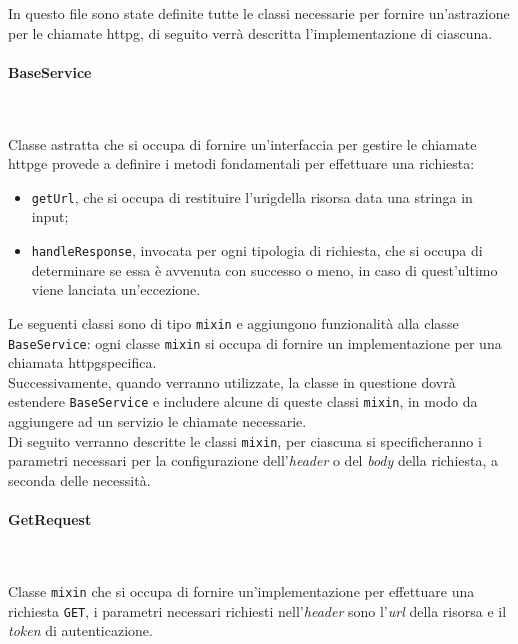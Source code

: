 In questo file sono state definite tutte le classi necessarie per fornire un'astrazione per le chiamate \gls{httpg}\glsoccur, di seguito verrà descritta l'implementazione di ciascuna.

\paragraph*{BaseService} ~ \\
\label{par:base-service}

\noindent Classe astratta che si occupa di fornire un'interfaccia per gestire le chiamate \gls{httpg}\glsoccur e provede a definire i metodi fondamentali per effettuare una richiesta:
\begin{itemize}
    \item \lstinline{getUrl}, che si occupa di restituire l'\gls{urig}\glsoccur della risorsa data una stringa in input;
    \item \lstinline{handleResponse}, invocata per ogni tipologia di richiesta, che si occupa di determinare se essa è avvenuta con successo o meno, in caso di quest'ultimo viene lanciata un'eccezione.
\end{itemize}
Le seguenti classi sono di tipo \lstinline{mixin} \cite{site:mixins} e aggiungono funzionalità alla classe \lstinline{BaseService}: ogni classe \lstinline{mixin} si occupa di fornire un implementazione per una chiamata \gls{httpg}\glsoccur specifica. \\
Successivamente, quando verranno utilizzate, la classe in questione dovrà estendere \lstinline{BaseService} e includere alcune di queste classi \lstinline{mixin}, in modo da aggiungere ad un servizio le chiamate necessarie.\\
Di seguito verranno descritte le classi \lstinline{mixin}, per ciascuna si specificheranno i parametri necessari per la configurazione dell'\emph{header} o del \emph{body} della richiesta, a seconda delle necessità. \\

\paragraph*{GetRequest} ~ \\
\label{par:get-request}

\noindent Classe \lstinline{mixin} che si occupa di fornire un'implementazione per effettuare una richiesta \lstinline{GET}, i parametri necessari richiesti nell'\emph{header} sono l'\emph{url} della risorsa e il \emph{token} di autenticazione.

